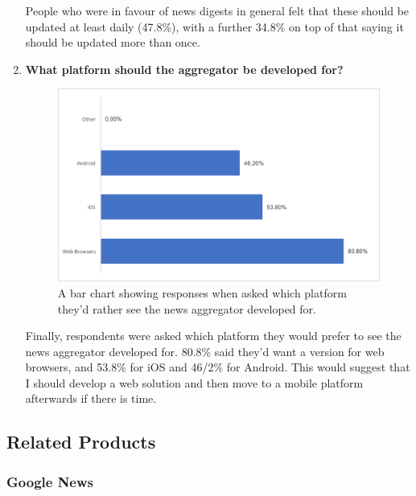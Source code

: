\documentclass[12pt]{article}
\begin{document}
\begin{enumerate}
People who were in favour of news digests in general felt that these should be updated at least daily (47.8\%), with a further 34.8\% on top of that saying it should be updated more than once.\\

\item \textbf{What platform should the aggregator be developed for?}

\begin{figure}[ht!]
  \centering
    \includegraphics[scale=0.7]{09WhatPlatform.png}
   \caption[Survey Graph concerning potential platforms]{A bar chart showing responses when asked which platform they'd rather see the news aggregator developed for.}
   \label{Survey Platform}
\end{figure}

Finally, respondents were asked which platform they would prefer to see the news aggregator developed for. 80.8\% said they'd want a version for web browsers, and 53.8\% for iOS and 46/2\% for Android. This would suggest that I should develop a web solution and then move to a mobile platform afterwards if there is time.\\

\end{enumerate}
 
\subsection{Related Products}

\subsubsection{Google News}
\end{document}
